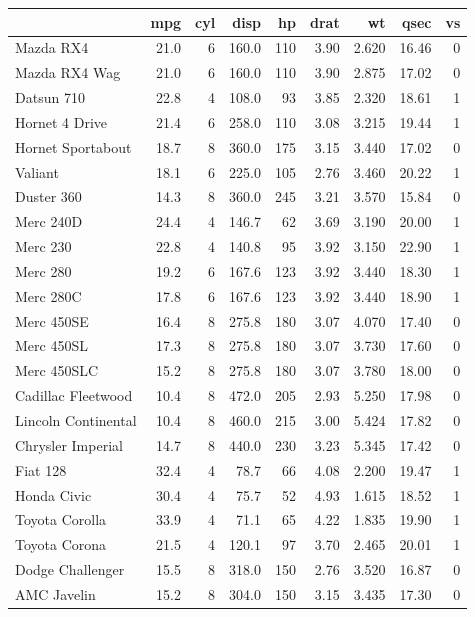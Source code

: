 \documentclass[a4paper, nobind]{templates/ociamthesis}
\begin{document}
\begin{longtable}{lrrrrrrrr}
\toprule
  & mpg & cyl & disp & hp & drat & wt & qsec & vs\\
\midrule
Mazda RX4 & 21.0 & 6 & 160.0 & 110 & 3.90 & 2.620 & 16.46 & 0\\
Mazda RX4 Wag & 21.0 & 6 & 160.0 & 110 & 3.90 & 2.875 & 17.02 & 0\\
Datsun 710 & 22.8 & 4 & 108.0 & 93 & 3.85 & 2.320 & 18.61 & 1\\
Hornet 4 Drive & 21.4 & 6 & 258.0 & 110 & 3.08 & 3.215 & 19.44 & 1\\
Hornet Sportabout & 18.7 & 8 & 360.0 & 175 & 3.15 & 3.440 & 17.02 & 0\\
\addlinespace
Valiant & 18.1 & 6 & 225.0 & 105 & 2.76 & 3.460 & 20.22 & 1\\
Duster 360 & 14.3 & 8 & 360.0 & 245 & 3.21 & 3.570 & 15.84 & 0\\
Merc 240D & 24.4 & 4 & 146.7 & 62 & 3.69 & 3.190 & 20.00 & 1\\
Merc 230 & 22.8 & 4 & 140.8 & 95 & 3.92 & 3.150 & 22.90 & 1\\
Merc 280 & 19.2 & 6 & 167.6 & 123 & 3.92 & 3.440 & 18.30 & 1\\
\addlinespace
Merc 280C & 17.8 & 6 & 167.6 & 123 & 3.92 & 3.440 & 18.90 & 1\\
Merc 450SE & 16.4 & 8 & 275.8 & 180 & 3.07 & 4.070 & 17.40 & 0\\
Merc 450SL & 17.3 & 8 & 275.8 & 180 & 3.07 & 3.730 & 17.60 & 0\\
Merc 450SLC & 15.2 & 8 & 275.8 & 180 & 3.07 & 3.780 & 18.00 & 0\\
Cadillac Fleetwood & 10.4 & 8 & 472.0 & 205 & 2.93 & 5.250 & 17.98 & 0\\
\addlinespace
Lincoln Continental & 10.4 & 8 & 460.0 & 215 & 3.00 & 5.424 & 17.82 & 0\\
Chrysler Imperial & 14.7 & 8 & 440.0 & 230 & 3.23 & 5.345 & 17.42 & 0\\
Fiat 128 & 32.4 & 4 & 78.7 & 66 & 4.08 & 2.200 & 19.47 & 1\\
Honda Civic & 30.4 & 4 & 75.7 & 52 & 4.93 & 1.615 & 18.52 & 1\\
Toyota Corolla & 33.9 & 4 & 71.1 & 65 & 4.22 & 1.835 & 19.90 & 1\\
\addlinespace
Toyota Corona & 21.5 & 4 & 120.1 & 97 & 3.70 & 2.465 & 20.01 & 1\\
Dodge Challenger & 15.5 & 8 & 318.0 & 150 & 2.76 & 3.520 & 16.87 & 0\\
AMC Javelin & 15.2 & 8 & 304.0 & 150 & 3.15 & 3.435 & 17.30 & 0\\

\end{longtable}
\end{document}
